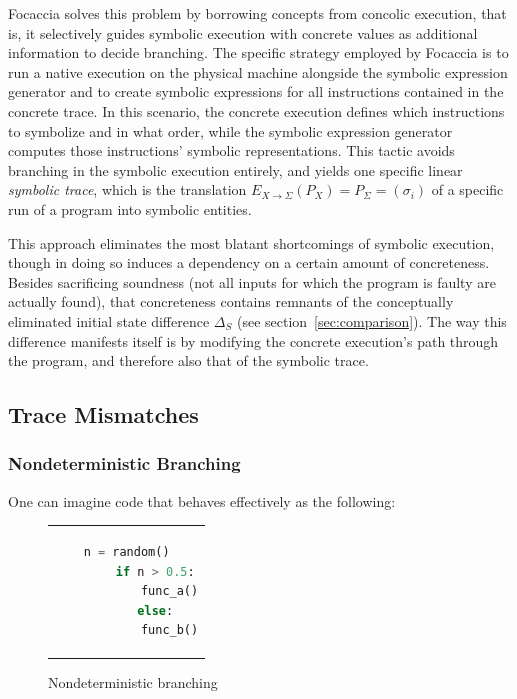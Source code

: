 Focaccia solves this problem by borrowing concepts from concolic execution, that is, it selectively guides symbolic
execution with concrete values as additional information to decide branching. The specific strategy employed by Focaccia
is to run a native execution on the physical machine alongside the symbolic expression generator and to create symbolic
expressions for all instructions contained in the concrete trace. In this scenario, the concrete execution defines which
instructions to symbolize and in what order, while the symbolic expression generator computes those instructions'
symbolic representations. This tactic avoids branching in the symbolic execution entirely, and yields one specific
linear \textit{symbolic trace}, which is the translation $E_{X \rightarrow \Sigma}(P_X) = P_\Sigma = (\sigma_i)$ of a
specific run of a program into symbolic entities.

This approach eliminates the most blatant shortcomings of symbolic execution, though in doing so induces a dependency on
a certain amount of concreteness. Besides sacrificing soundness (not all inputs for which the program is faulty are
actually found), that concreteness contains remnants of the conceptually eliminated initial state difference $\Delta_S$
(see section~\ref{sec:comparison}). The way this difference manifests itself is by modifying the concrete execution's
path through the program, and therefore also that of the symbolic trace.

\subsection{Trace Mismatches}\label{sec:trace_mismatch}

\subsubsection{Nondeterministic Branching}

One can imagine code that behaves effectively as the following:

\begin{figure}[htbp]
    \centering
    \begin{tabular}{c}
    \begin{lstlisting}[language=Python]
        n = random()
        if n > 0.5:
            func_a()
        else:
            func_b()
    \end{lstlisting}
    \end{tabular}
    \caption{Nondeterministic branching}\label{fig:random_branching}
\end{figure}

